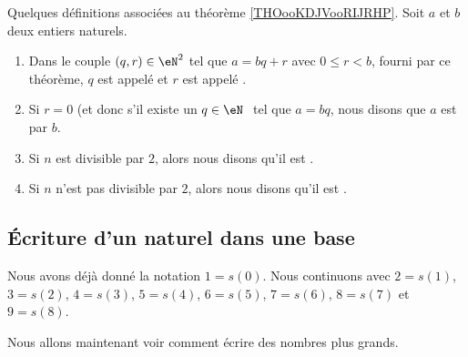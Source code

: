 \begin{definition}	\label{DEFooDivisibleNombrePairImpair}
	Quelques définitions associées au théorème \ref{THOooKDJVooRIJRHP}. Soit \( a \) et \( b \) deux entiers naturels.
	\begin{enumerate}
		\item
		      Dans le couple \( (q,r)\in \eN^2\) tel que \( a=bq+r\) avec \( 0\leq r<b\), fourni par ce théorème, \( q \) est appelé  et \( r \) est appelé .
		\item
		      Si \( r=0\) (et donc s'il existe un \( q \in \eN \) tel que \( a = bq \), nous disons que \( a\) est  par \( b\).
		\item
		      Si \( n\) est divisible par \( 2\), alors nous disons qu'il est .
		      \item\label{ITEMooDLHHooTmWSnN}
		      Si \( n\) n'est pas divisible par \( 2\), alors nous disons qu'il est .
	\end{enumerate}
\end{definition}

\subsection{Écriture d'un naturel dans une base}
\label{SUBooEcritureNaturels}

\begin{normaltext}	\label{NORooEcritureChiffres}
	Nous avons déjà donné la notation \( 1=s(0)\). Nous continuons avec \( 2=s(1)\), \( 3=s(2)\), \( 4=s(3)\), \( 5=s(4)\), \( 6=s(5)\), \( 7=s(6)\), \( 8=s(7)\) et \( 9=s(8)\).

	Nous allons maintenant voir comment écrire des nombres plus grands.
\end{normaltext}

